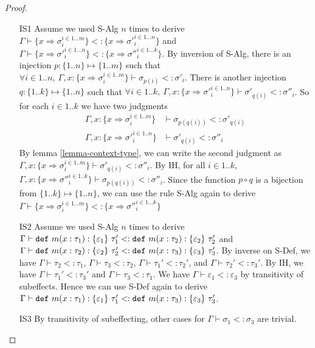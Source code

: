 \begin{proof}
\begin{itemize}
\item[IS1] Assume we used S-Alg $n$ times to derive $\Gamma \vdash \{x \Rightarrow \sigma_i^{i\in1...m}\} <:  \{x \Rightarrow {\sigma'}_i^{i\in1...n}\} $ and \mbox{$\Gamma \vdash \{x \Rightarrow {\sigma'}_i^{i\in1...n}\} <:  \{x \Rightarrow {\sigma''}_i^{i\in1...k}\}$}. By inversion of S-Alg, there is an injection $p: \{1..n\} \mapsto  \{1..m\}$ such that $\forall i \in 1..n,\ \Gamma, x: \{x \Rightarrow {\sigma}_i^{i\in 1..m} \} \vdash \sigma_{p(i)} <: \sigma'_i$. There is another injection $q: \{1..k\} \mapsto \{1..n\}$ such that $\forall i \in 1..k,\ \Gamma, x: \{x \Rightarrow {\sigma'}_i^{i\in 1..n} \} \vdash \sigma'_{q(i)} <: \sigma''_i$. So for each $i \in 1..k$ we have two judgments 
\begin{align*}
\Gamma, x: \{x \Rightarrow {\sigma}_i^{i\in 1..m} \} &\vdash \sigma_{p(q(i))} <: \sigma'_{q(i)}\\
\Gamma, x: \{x \Rightarrow {\sigma'}_i^{i\in 1..n} \} &\vdash \sigma'_{q(i)} <: \sigma''_i
\end{align*}
By lemma \ref{lemma-context-type}, we can write the second judgment as $\Gamma, x: \{x \Rightarrow {\sigma}_i^{i\in 1..m} \} \vdash \sigma'_{q(i)} <: \sigma''_{i}$. By IH, for all $i \in 1..k$, $ \Gamma, x: \{x \Rightarrow {\sigma''}_i^{i\in 1..k} \} \vdash \sigma_{p(q(i))} <: \sigma''_i$. Since the  function $p \circ q$ is a bijection from $\{1..k\} \mapsto \{1..n\}$, we can use the rule S-Alg again to derive $\Gamma \vdash \{x \Rightarrow \sigma_i^{i\in1...m}\} <:  \{x \Rightarrow {\sigma''}_i^{i\in1...k}\} $ 
\item[IS2] Assume we used S-Alg $n$ times to derive 
$\Gamma \vdash \mathtt{def}~ m(x : \tau_1) : \{ \varepsilon_1 \}~\tau_1' <: \mathtt{def}~ m(x : \tau_2) : \{ \varepsilon_2 \}~\tau_2'$
and
$\Gamma \vdash \mathtt{def}~ m(x : \tau_2) : \{ \varepsilon_2 \}~\tau_2' <: \mathtt{def}~ m(x : \tau_3) : \{ \varepsilon_3 \}~\tau_3'$. By inverse on S-Def, we have $\Gamma \vdash \tau_2 <: \tau_1$, $\Gamma \vdash \tau_3 <: \tau_2$, $\Gamma \vdash \tau_1' <: \tau_2'$, and $\Gamma \vdash \tau_2' <: \tau_3'$. By IH, we have $\Gamma \vdash \tau_1' <: \tau_3'$ and $\Gamma \vdash \tau_3 <: \tau_1$. We have $\Gamma \vdash \varepsilon_1 <: \varepsilon_3$ by transitivity of subeffects. Hence we can use S-Def again to derive $\Gamma \vdash \mathtt{def}~ m(x : \tau_1) : \{ \varepsilon_1 \}~\tau_1' <: \mathtt{def}~ m(x : \tau_3) : \{ \varepsilon_3 \}~\tau_3'$. 
\item[IS3] By transitivity of subeffecting, other cases for $\Gamma \vdash \sigma_1 <: \sigma_3$ are trivial. 

\end{itemize}
\end{proof}


